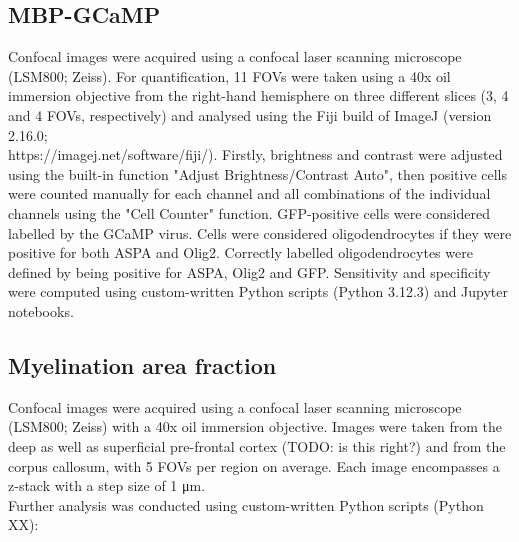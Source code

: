 \subsection{MBP-GCaMP}
Confocal images were acquired using a confocal laser scanning microscope (LSM800; Zeiss).
For quantification, 11 FOVs were taken using a 40x oil immersion objective from the right-hand hemisphere on three different slices (3, 4 and 4 FOVs, respectively) and analysed using the Fiji build of ImageJ (version 2.16.0;\\ https://imagej.net/software/fiji/). Firstly, brightness and contrast were adjusted using the built-in function "Adjust Brightness/Contrast Auto", then positive cells were counted manually for each channel and all combinations of the individual channels using the "Cell Counter" function.
GFP-positive cells were considered labelled by the GCaMP virus. Cells were considered oligodendrocytes if they were positive for both ASPA and Olig2. Correctly labelled oligodendrocytes were defined by being positive for ASPA, Olig2 and GFP. Sensitivity and specificity were computed using custom-written Python scripts (Python 3.12.3) and Jupyter notebooks.
\subsection{Myelination area fraction}
Confocal images were acquired using a confocal laser scanning microscope (LSM800; Zeiss) with a 40x oil immersion objective. Images were taken from the deep as well as superficial pre-frontal cortex (TODO: is this right?) and from the corpus callosum, with 5 FOVs per region on average. Each image encompasses a z-stack with a step size of 1 μm.\\
Further analysis was conducted using custom-written Python scripts (Python XX):
